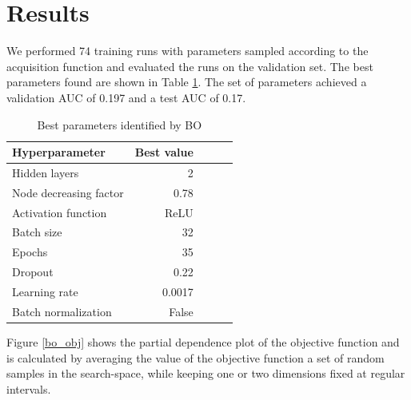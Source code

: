 \documentclass[bsc,frontabs,twoside,singlespacing,parskip,deptreport]{infthesis}     %
\let\Oldsection\section
\renewcommand{\section}{\FloatBarrier\Oldsection}
\begin{document}
\section{Results}
We performed 74 training runs with parameters sampled according to the acquisition function and evaluated the runs on the validation set. The best parameters found are shown in Table \ref{bo_results}.
The set of parameters achieved a validation AUC of 0.197 and a test AUC of 0.17.
\begin{table}[h!]
\centering
\begin{tabular}{lrrrr}
\toprule
{Hyperparameter} &  Best value  \\
\midrule
Hidden layers & 2 \\
Node decreasing factor & 0.78 \\
Activation function & ReLU \\
Batch size & 32 \\
Epochs & 35 \\
Dropout & 0.22 \\
Learning rate & 0.0017  \\
Batch normalization & False \\
\bottomrule
\end{tabular}
\caption{Best parameters identified by BO}\label{bo_results}
\end{table}
Figure \ref{bo_obj} shows the partial dependence plot of the objective function and is calculated by averaging the value of the objective function a set of random samples in the search-space, while keeping one or two dimensions fixed at regular intervals. 
\end{document}
